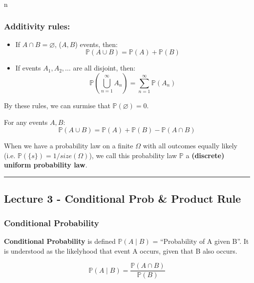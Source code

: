 n\documentclass{article}
\begin{document}
\bigskip
\subsubsection{Additivity rules:}

\begin{itemize}
\item If $A \cap B = \varnothing$, ($A, B$) events, then:
  \begin{equation}
    \boxed{
      \mathbb{P}(A \cup B) = \mathbb{P}(A) + \mathbb{P}(B)
    }
  \end{equation}

\item If events $A_1, A_2, \dots$ are all disjoint, then:
  \begin{equation}
    \boxed{
      \mathbb{P} (\bigcup\limits_{n=1}^{\infty} A_n) =
      \sum_{n=1}^{\infty} \mathbb{P}(A_n)
    }
  \end{equation}
\end{itemize}

By these rules, we can surmise that $\boxed{\mathbb{P} (\varnothing) =
  0}$.

For any events $A, B$:
\begin{equation}
  \tag{Event Union}
  \boxed{
    \mathbb{P}(A \cup B) = \mathbb{P}(A) + \mathbb{P}(B) -
    \mathbb{P}(A \cap B)
  }
\end{equation}

When we have a probability law on a finite $\Omega$ with all outcomes
equally likely (i.e. $\mathbb{P}(\{s\}) = 1/size(\Omega)$), we call
this probability law $\mathbb{P}$ a \textbf{(discrete) uniform
  probability law}.


\medskip \hrule
\subsection{Lecture 3 - Conditional Prob \& Product Rule}

\subsubsection{Conditional Probability}

\textbf{Conditional Probability} is defined $\mathbb{P}(A \mid B)$ =
``Probability of A given B''. It is understood as the likelyhood that
event A occurs, given that B also occurs. 

\begin{equation}
  \tag{Conditional Probability Def}
  \boxed{
    \mathbb{P}(A \mid B) = \frac{\mathbb{P}(A \cap B)}{\mathbb{P}(B)}
  }
\end{equation}
\end{document}
